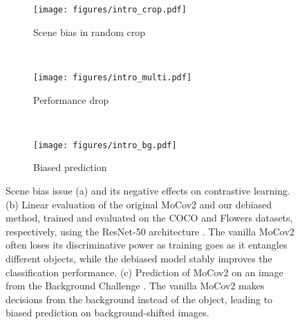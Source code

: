 \begin{figure}[t]
\centering
\begin{subfigure}{0.46\textwidth}
\texttt{[image: figures/intro\_crop.pdf]}
\caption{Scene bias in random crop}\label{fig:intro-crop}
\end{subfigure}~
\begin{subfigure}{0.33\textwidth}
\texttt{[image: figures/intro\_multi.pdf]}
\caption{Performance drop}\label{fig:intro-multi}
\end{subfigure}~
\begin{subfigure}{0.19\textwidth}
\texttt{[image: figures/intro\_bg.pdf]}
\caption{Biased prediction}\label{fig:intro-bg}
\end{subfigure}
\caption{
Scene bias issue (a) and its negative effects on contrastive learning. (b) Linear evaluation \citep{kolesnikov2019revisiting} of the original MoCov2 \citep{he2020momentum} and our debiased method, trained and evaluated on the COCO \citep{lin2014microsoft} and Flowers \citep{nilsback2006visual} datasets, respectively, using the ResNet-50 architecture \cite{he2016deep}. The vanilla MoCov2 often loses its discriminative power as training goes as it entangles different objects, while the debiased model stably improves the classification performance. (c) Prediction of MoCov2 on an image from the Background Challenge \citep{xiao2021noise}. The vanilla MoCov2 makes decisions from the background instead of the object, leading to biased prediction on background-shifted images.
}\label{fig:intro}
\end{figure}

